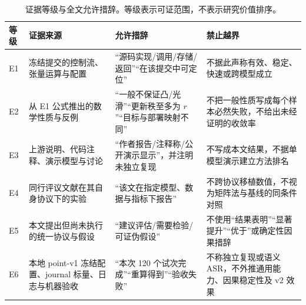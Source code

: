 \begin{table}[t]
\centering
\caption{证据等级与全文允许措辞。等级表示可证范围，不表示研究价值排序。}
\label{tab:evidence-boundaries}
\footnotesize
\setlength{\tabcolsep}{4pt}
\begin{tabularx}{\textwidth}{@{}p{}p{}Y Y@{}}
\toprule
等级 & 证据来源 & 允许措辞 & 禁止越界 \\
\midrule
E1 & 冻结提交的控制流、张量运算与配置 & “源码实现/调用/存储/返回”“在该提交中可定位” & 不据此声称有效、稳定、快速或跨模型成立 \\
E2 & 从 E1 公式推出的数学性质与反例 & “一般不保证凸/光滑”“更新秩至多为 $r$”“目标与部署映射不同” & 不把一般性质写成每个样本必然失败，不给出未经证明的收敛率 \\
E3 & 上游说明、代码注释、演示模型与讨论 & “作者报告/注释称/公开演示显示”，并注明未独立复现 & 不写成本文结果，不据单模型演示建立方法排名 \\
E4 & 同行评议文献在其自身协议下的实验 & “该文在指定模型、数据与指标下报告”\cite{piras2026som,arditi2024refusal} & 不跨协议移植数值，不视为矩阵法与基线的同条件对照 \\
E5 & 本文提出但尚未执行的统一协议与假设 & “建议评估/需要检验/可证伪假设”\cite{mazeika2024harmbench} & 不使用“结果表明”“显著提升”“优于”或确定性因果措辞 \\
E6 & 本地 point-v1 冻结配置、journal 标量、日志与机器验收 & “本次 120 个试次完成”“重算得到”“验收失败”\cite{ara2026archive} & 不称独立复现或语义 ASR，不外推通用能力、因果稳定性及 v2 效果 \\
\bottomrule
\end{tabularx}
\end{table}
